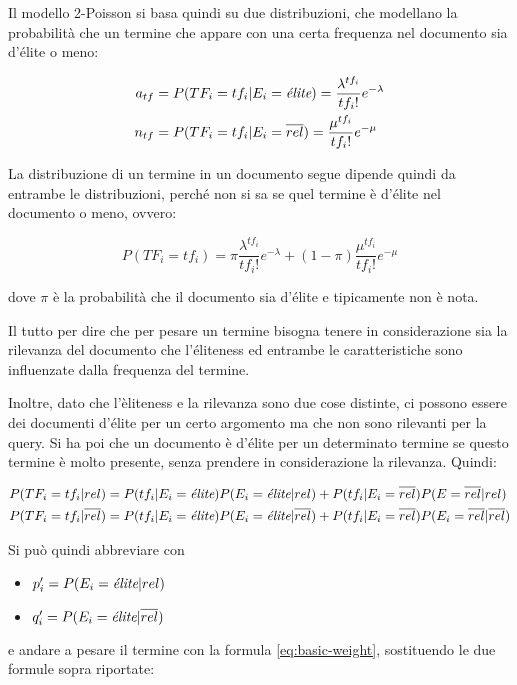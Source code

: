 Il modello 2-Poisson si basa quindi su due distribuzioni, che modellano la probabilità che un termine che appare con una certa frequenza nel documento sia d'élite o meno:

\begin{align}
a_{tf} &= P(TF_i = tf_i | E_i = \elite) = \frac{\lambda^{tf_i}}{{tf_i}!}e^{-\lambda}\\
n_{tf} &= P(TF_i = tf_i | E_i = \notelite) = \frac{\mu^{tf_i}}{{tf_i}!}e^{-\mu}
\end{align}

La distribuzione di un termine in un documento segue dipende quindi da entrambe le distribuzioni, perché non si sa se quel termine è d'élite nel documento o meno, ovvero:

$$
P(TF_i = tf_i) = \pi \frac{\lambda^{tf_i}}{{tf_i}!}e^{-{\lambda}} + (1 - \pi) \frac{\mu^{tf_i}}{{tf_i}!}e^{-\mu}
$$

\noindent dove $\pi$ è la probabilità che il documento sia d'élite e tipicamente non è nota.

Il tutto per dire che per pesare un termine bisogna tenere in considerazione sia la rilevanza del documento che l'éliteness ed entrambe le caratteristiche sono influenzate dalla frequenza del termine. 

Inoltre, dato che l'èliteness e la rilevanza sono due cose distinte, ci possono essere dei documenti d'élite per un certo argomento ma che non sono rilevanti per la query.
Si ha poi che un documento è d'élite per un determinato termine se questo termine è molto presente, senza prendere in considerazione la rilevanza.
Quindi:

\begin{align}
P(TF_i = tf_i | \rel) &= P(tf_i | E_i = \elite)P(E_i = \elite | \rel) + P(tf_i |E_i = \notelite)P(E = \notelite | \rel) \\
P(TF_i = tf_i | \notrel) &= P(tf_i | E_i = \elite)P(E_i = \elite | \notrel) + P(tf_i |E_i = \notelite)P(E_i = \notelite | \notrel) 
\end{align}

Si può quindi abbreviare con

\begin{itemize}
	\item $p_i' = P(E_i = \elite | \rel)$
	\item $q_i' = P(E_i = \elite | \notrel)$
\end{itemize}

e andare a pesare il termine con la formula \ref{eq:basic-weight}, sostituendo le due formule sopra riportate:

